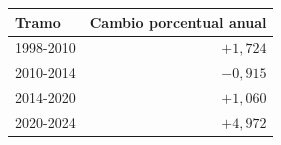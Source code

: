 \begin{tabular}{lr}
\toprule
\textbf{Tramo} & \textbf{Cambio porcentual anual} \\
\midrule
1998-2010 & $+1{,}724$ \\
2010-2014 & $-0{,}915$ \\
2014-2020 & $+1{,}060$ \\
2020-2024 & $+4{,}972$ \\
\bottomrule
\end{tabular}
